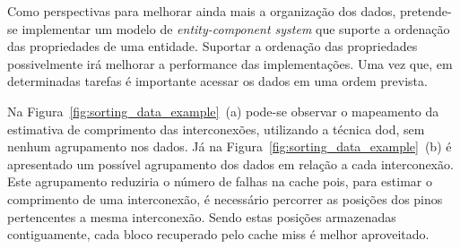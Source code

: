 \begin{table}[h]
\centering
\caption{Síntese dos resultados preliminares.}
\label{tab:sintese_resultados}
\end{table}

Como perspectivas para melhorar ainda mais a organização dos dados, pretende-se implementar um modelo de \textit{entity-component system} que suporte a ordenação das propriedades de uma entidade.
Suportar a ordenação das propriedades possivelmente irá melhorar a performance das implementações.
Uma vez que, em determinadas tarefas é importante acessar os dados em uma ordem prevista.

Na Figura~\ref{fig:sorting_data_example}~(a) pode-se observar o mapeamento da estimativa de comprimento das interconexões, utilizando a técnica \ac{dod}, sem nenhum agrupamento nos dados.
Já na Figura~\ref{fig:sorting_data_example}~(b) é apresentado um possível agrupamento dos dados em relação a cada interconexão.
Este agrupamento reduziria o número de falhas na cache pois, para estimar o comprimento de uma interconexão, é necessário percorrer as posições dos pinos pertencentes a mesma interconexão.
Sendo estas posições armazenadas contiguamente, cada bloco recuperado pelo cache miss é melhor aproveitado.


